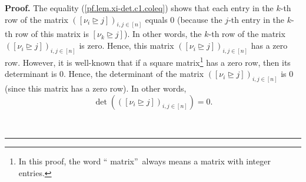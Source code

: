\documentclass[numbers=enddot,12pt,final,onecolumn,notitlepage,english]{scrartcl}%
\theoremstyle{definition}
\newenvironment{proof}[1][Proof]{\noindent\textbf{#1.} }{\ \rule{0.5em}{0.5em}}
\newenvironment{verlong}{}{}
\begin{document}
\begin{proof}
\begin{verlong}
The equality (\ref{pf.lem.xi-det.c1.coleq}) shows that each entry in the
$k$-th row of the matrix $\left(  \left[  \nu_{i}\trianglerighteq j\right]
\right)  _{i,j\in\left[  n\right]  }$ equals $0$ (because the $j$-th entry in
the $k$-th row of this matrix is $\left[  \nu_{k}\trianglerighteq j\right]
$). In other words, the $k$-th row of the matrix $\left(  \left[  \nu
_{i}\trianglerighteq j\right]  \right)  _{i,j\in\left[  n\right]  }$ is zero.
Hence, this matrix $\left(  \left[  \nu_{i}\trianglerighteq j\right]  \right)
_{i,j\in\left[  n\right]  }$ has a zero row. However, it is well-known that if
a square matrix\footnote{In this proof, the word \textquotedblleft
matrix\textquotedblright\ always means a matrix with integer entries.} has a
zero row, then its determinant is $0$. Hence, the determinant of the matrix
$\left(  \left[  \nu_{i}\trianglerighteq j\right]  \right)  _{i,j\in\left[
n\right]  }$ is $0$ (since this matrix has a zero row). In other words,
\begin{equation}
\det\left(  \left(  \left[  \nu_{i}\trianglerighteq j\right]  \right)
_{i,j\in\left[  n\right]  }\right)  =0. \label{pf.lem.xi-det.c1.det=0}%
\end{equation}



\end{verlong}
\end{proof}
\end{document}
